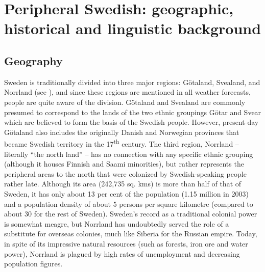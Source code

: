 
\chapter{Peripheral Swedish: geographic, historical and linguistic background}
\section{ Geography}

Sweden is traditionally divided into three major regions: Götaland, Svealand, and Norrland (see ), and since these regions are mentioned in all weather forecasts, people are quite aware of the division. Götaland and Svealand are commonly presumed to correspond to the lands of the two ethnic groupings Götar and Svear which are believed to form the basis of the Swedish people.  However, present-day Götaland also includes the originally Danish and Norwegian provinces that became Swedish territory in the 17\textsuperscript{th} century. The third region, Norrland – literally “the north land” – has no connection with any specific ethnic grouping (although it houses Finnish and Saami minorities), but rather represents the peripheral areas to the north that were colonized by Swedish-speaking people rather late. Although its area (242,735 sq. kms) is more than half of that of Sweden, it has only about 13 per cent of the population (1.15 million in 2003) and a population density of about 5 persons per square kilometre (compared to about 30 for the rest of Sweden). Sweden’s record as a traditional colonial power is somewhat meagre, but Norrland has undoubtedly served the role of a substitute for overseas colonies, much like Siberia for the Russian empire. Today, in spite of its impressive natural resources (such as forests, iron ore and water power), Norrland is plagued by high rates of unemployment and decreasing population figures. 

